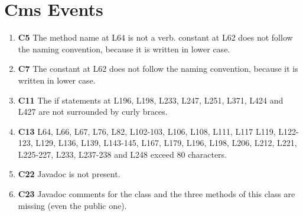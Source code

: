 \section{Cms Events}
\begin{enumerate}
\item \textbf{C5} The method name at L64 is not a verb. constant at L62 does not follow the naming convention, because it is written in lower case.
\item \textbf{C7} The constant at L62 does not follow the naming convention, because it is written in lower case.
\item \textbf{C11} The if statements at L196, L198, L233, L247, L251, L371, L424 and L427 are not surrounded by curly braces.
\item \textbf{C13} L64, L66, L67, L76, L82, L102-103, L106, L108, L111, L117 L119, L122-123, L129, L136, L139, L143-145, L167, L179, L196, L198, L206, L212, L221, L225-227, L233, L237-238 and L248 exceed 80 characters.
\item \textbf{C22} Javadoc is not present.
\item \textbf{C23} Javadoc comments for the class and the three methods of this class are missing (even the public one).
\end{enumerate}
